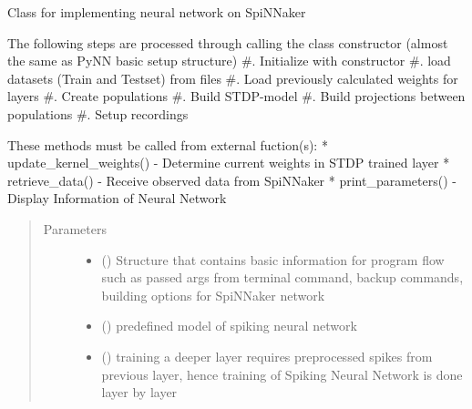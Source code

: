\documentclass[letterpaper,10pt,english]{sphinxmanual}
\begin{document}

\begin{fulllineitems}
\label{\detokenize{SpikingConvNet:SpikingConvNet.classes.Spinnaker_Network}}
Class for implementing neural network on SpiNNaker

The following steps are processed through calling the class constructor
(almost the same as PyNN basic setup structure)
\#. Initialize with constructor
\#. load datasets (Train and Testset) from files
\#. Load previously calculated weights for layers
\#. Create populations
\#. Build STDP-model
\#. Build projections between populations
\#. Setup recordings

These methods must be called from external fuction(s):
* update\_kernel\_weights() - Determine current weights in STDP trained layer
* retrieve\_data() - Receive observed data from SpiNNaker
* print\_parameters() - Display Information of Neural Network
\begin{quote}\begin{description}
\item[{Parameters}] \leavevmode\begin{itemize}
\item {} 
 () \textendash{} Structure that contains basic information for program flow such as
passed args from terminal command, backup commands, building options
for SpiNNaker network

\item {} 
 () \textendash{} predefined model of spiking neural network

\item {} 
 () \textendash{} training a deeper layer requires preprocessed spikes from previous
layer, hence training of Spiking Neural Network is done layer by
layer

\end{itemize}

\end{description}\end{quote}


\end{fulllineitems}
\end{document}
